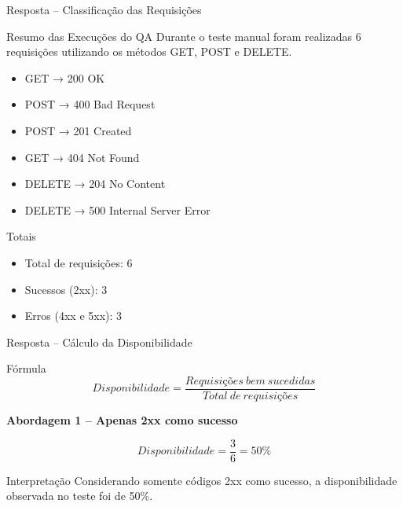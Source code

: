 \documentclass[9pt]{beamer}
\begin{document}
\begin{frame}{Resposta – Classificação das Requisições}

\begin{block}{Resumo das Execuções do QA}
Durante o teste manual foram realizadas 6 requisições
utilizando os métodos GET, POST e DELETE.
\end{block} 

\begin{itemize}
    \item GET → 200 OK 
    \item POST → 400 Bad Request 
    \item POST → 201 Created 
    \item GET → 404 Not Found 
    \item DELETE → 204 No Content 
    \item DELETE → 500 Internal Server Error 
\end{itemize}

\begin{block}{Totais}
\begin{itemize}
    \item Total de requisições: 6
    \item Sucessos (2xx): 3
    \item Erros (4xx e 5xx): 3
\end{itemize}
\end{block}

\end{frame}
\begin{frame}{Resposta – Cálculo da Disponibilidade}

\begin{block}{Fórmula}
\[
Disponibilidade =
\frac{Requisições\ bem\ sucedidas}
{Total\ de\ requisições}
\]
\end{block}

\textbf{Abordagem 1 – Apenas 2xx como sucesso}

\[
Disponibilidade = \frac{3}{6} = 50\%
\]

\begin{block}{Interpretação}
Considerando somente códigos 2xx como sucesso,
a disponibilidade observada no teste foi de 50\%.
\end{block}

\end{frame}
\end{document}
